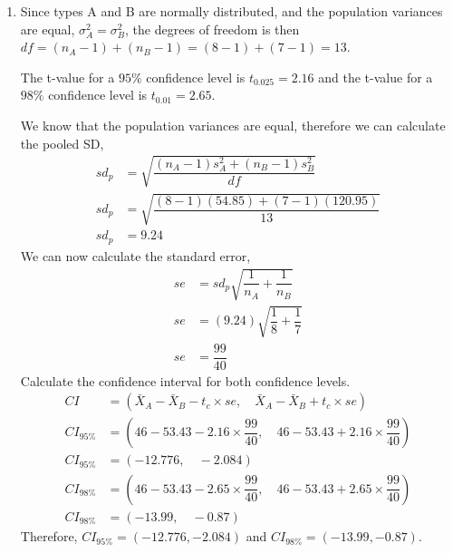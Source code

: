 \documentclass[12pt]{book}
\begin{document}
\begin{enumerate}
\begin{enumerate}
        \item %
        
        Since types A and B are normally distributed, and the population variances are equal, $\sigma^2_{A} = \sigma^2_{B}$, the degrees of freedom is then $df=(n_A-1) + (n_B-1)=(8-1)+(7-1)=13$.
        
        The t-value for a $95\%$ confidence level is $t_{0.025} = 2.16$ and the t-value for a $98\%$ confidence level is $t_{0.01} = 2.65$.
        
        We know that the population variances are equal, therefore we can calculate the pooled SD,
        \begin{align*}
            sd_p &= \sqrt{\dfrac{(n_A - 1)s^2_A + (n_B - 1)s^2_B}{df}}\\
            sd_p &= \sqrt{\dfrac{(8 - 1)(54.85) + (7 - 1)(120.95)}{13}}\\
            sd_p &= 9.24
        \end{align*}
        We can now calculate the standard error,
        \begin{align*}
            se &= sd_p\sqrt{\dfrac{1}{n_A}+\dfrac{1}{n_B}}\\
            se &= (9.24)\sqrt{\dfrac{1}{8}+\dfrac{1}{7}}\\
            se &= \dfrac{99}{40}
        \end{align*}
        Calculate the confidence interval for both confidence levels.
        \begin{align*}
            CI &= \left(\bar{X}_A-\bar{X}_B - t_c \times se, \quad \bar{X}_A-\bar{X}_B + t_c \times se\right)\\
            CI_{95\%} &= \left( 46-53.43 - 2.16 \times \dfrac{99}{40}, \quad 46-53.43 + 2.16 \times \dfrac{99}{40} \right)\\
            CI_{95\%} &= (-12.776, \quad -2.084)\\
            CI_{98\%} &= \left( 46-53.43 - 2.65 \times \dfrac{99}{40}, \quad 46-53.43 + 2.65 \times \dfrac{99}{40} \right)\\
            CI_{98\%} &= (-13.99, \quad -0.87)
        \end{align*}
        Therefore, $CI_{95\%} = (-12.776, -2.084)$ and $CI_{98\%} = (-13.99, -0.87)$.
        
        
        
        

\end{enumerate}
\end{enumerate}
\end{document}
